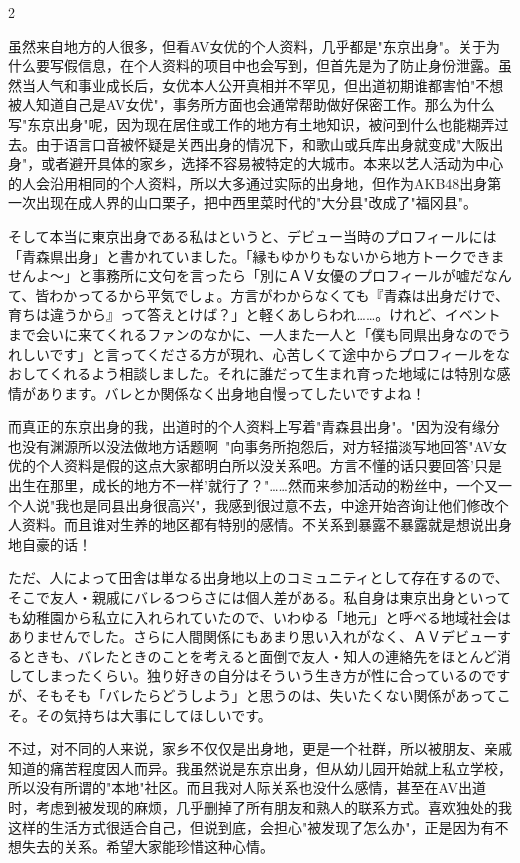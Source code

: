 \documentclass[12pt,UTF8]{ctexbook}
\begin{document}
\begin{paracol}{2}
\switchcolumn

虽然来自地方的人很多，但看AV女优的个人资料，几乎都是"东京出身"。关于为什么要写假信息，在个人资料的项目中也会写到，但首先是为了防止身份泄露。虽然当人气和事业成长后，女优本人公开真相并不罕见，但出道初期谁都害怕"不想被人知道自己是AV女优"，事务所方面也会通常帮助做好保密工作。那么为什么写"东京出身"呢，因为现在居住或工作的地方有土地知识，被问到什么也能糊弄过去。由于语言口音被怀疑是关西出身的情况下，和歌山或兵库出身就变成"大阪出身"，或者避开具体的家乡，选择不容易被特定的大城市。本来以艺人活动为中心的人会沿用相同的个人资料，所以大多通过实际的出身地，但作为AKB48出身第一次出现在成人界的山口栗子，把中西里菜时代的"大分县"改成了"福冈县"。

\switchcolumn*

そして本当に東京出身である私はというと、デビュー当時のプロフィールには「青森県出身」と書かれていました。「縁もゆかりもないから地方トークできませんよ〜」と事務所に文句を言ったら「別にＡＶ女優のプロフィールが嘘だなんて、皆わかってるから平気でしょ。方言がわからなくても『青森は出身だけで、育ちは違うから』って答えとけば？」と軽くあしらわれ……。けれど、イベントまで会いに来てくれるファンのなかに、一人また一人と「僕も同県出身なのでうれしいです」と言ってくださる方が現れ、心苦しくて途中からプロフィールをなおしてくれるよう相談しました。それに誰だって生まれ育った地域には特別な感情があります。バレとか関係なく出身地自慢ってしたいですよね！

\switchcolumn

而真正的东京出身的我，出道时的个人资料上写着"青森县出身"。"因为没有缘分也没有渊源所以没法做地方话题啊~"向事务所抱怨后，对方轻描淡写地回答"AV女优的个人资料是假的这点大家都明白所以没关系吧。方言不懂的话只要回答'只是出生在那里，成长的地方不一样'就行了？"……然而来参加活动的粉丝中，一个又一个人说"我也是同县出身很高兴"，我感到很过意不去，中途开始咨询让他们修改个人资料。而且谁对生养的地区都有特别的感情。不关系到暴露不暴露就是想说出身地自豪的话！

\switchcolumn*

ただ、人によって田舎は単なる出身地以上のコミュニティとして存在するので、そこで友人・親戚にバレるつらさには個人差がある。私自身は東京出身といっても幼稚園から私立に入れられていたので、いわゆる「地元」と呼べる地域社会はありませんでした。さらに人間関係にもあまり思い入れがなく、ＡＶデビューするときも、バレたときのことを考えると面倒で友人・知人の連絡先をほとんど消してしまったくらい。独り好きの自分はそういう生き方が性に合っているのですが、そもそも「バレたらどうしよう」と思うのは、失いたくない関係があってこそ。その気持ちは大事にしてほしいです。

\switchcolumn

不过，对不同的人来说，家乡不仅仅是出身地，更是一个社群，所以被朋友、亲戚知道的痛苦程度因人而异。我虽然说是东京出身，但从幼儿园开始就上私立学校，所以没有所谓的"本地"社区。而且我对人际关系也没什么感情，甚至在AV出道时，考虑到被发现的麻烦，几乎删掉了所有朋友和熟人的联系方式。喜欢独处的我这样的生活方式很适合自己，但说到底，会担心"被发现了怎么办"，正是因为有不想失去的关系。希望大家能珍惜这种心情。

\end{paracol}
\end{document}
